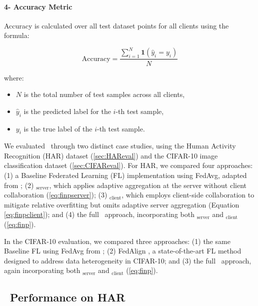 \paragraph{\textbf{4- Accuracy Metric}}

Accuracy is calculated over all test dataset points for all clients using the formula:

\begin{equation}
    \text{Accuracy} = \frac{\sum_{i=1}^{N} \mathbf{1}(\hat{y}_i = y_i)}{N}
\end{equation}

where:
\begin{itemize}
    \item $N$ is the total number of test samples across all clients,
    \item $\hat{y}_i$ is the predicted label for the $i$-th test sample,
    \item $y_i$ is the true label of the $i$-th test sample.
\end{itemize}

We evaluated \sysname\ through two distinct case studies, using the Human Activity Recognition (HAR) dataset (\autoref{sec:HAReval}) and the CIFAR-10 image classification dataset (\autoref{sec:CIFAReval}).  For HAR, we compared four approaches: (1) a Baseline Federated Learning (FL) implementation using FedAvg, adapted from \cite{hu2023source}; (2) \sysname$_\text{server}$, which applies adaptive aggregation at the server without client collaboration (\autoref{eq:finpserver}); (3) \sysname$_\text{client}$, which employs client-side collaboration to mitigate relative overfitting but omits adaptive server aggregation (Equation \ref{eq:finpclient}); and (4) the full \sysname\ approach, incorporating both \sysname$_\text{server}$ and \sysname$_\text{client}$ (\autoref{eq:finp}). 

In the CIFAR-10 evaluation, we compared three approaches: (1) the same Baseline FL using FedAvg from \cite{hu2023source}; (2) FedAlign \cite{mendieta2022local}, a state-of-the-art FL method designed to address data heterogeneity in CIFAR-10; and (3) the full \sysname\ approach, again incorporating both \sysname$_\text{server}$ and \sysname$_\text{client}$ (\autoref{eq:finp}).






\subsection{\sysname\ Performance on HAR}\label{sec:HAReval}


